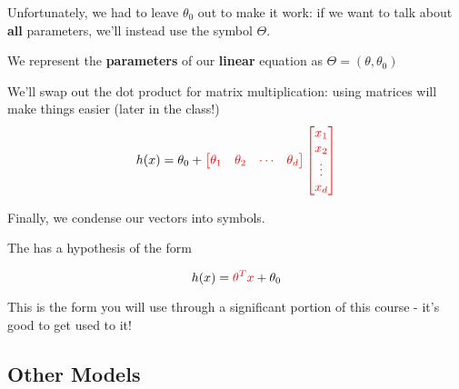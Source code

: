         Unfortunately, we had to leave $\theta_0$ out to make it work: if we want to talk about \textbf{all} parameters, we'll instead use the symbol $\Theta$.\\
        
        \begin{notation}
            We represent the \textbf{parameters} of our \textbf{linear} equation as $\Theta = (\theta, \theta_0)$
        \end{notation}
        
        We'll swap out the dot product for matrix multiplication: using matrices will make things easier (later in the class!)\\
        
        \begin{equation}
            h(x) = \theta_0 +
            \textcolor{red}{
                \begin{bmatrix}
                    \theta_1 & \theta_2 & \cdots & \theta_d
                \end{bmatrix}
                \begin{bmatrix}
                    x_1 \\ x_2 \\ \vdots \\ x_d
                \end{bmatrix}
            }
        \end{equation}
        
        Finally, we condense our vectors into symbols.\\
        
        \begin{kequation}
        
            The  has a hypothesis of the form
        
            \begin{equation*}
                h(x) = \textcolor{red}{ \theta^T x } + \theta_0
            \end{equation*}
        \end{kequation}
        
        
        This is the form you will use through a significant portion of this course - it's good to get used to it!
        
        
    \subsection{Other Models}
    
